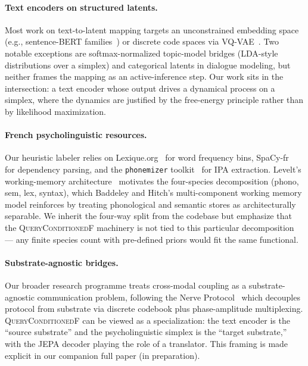 \paragraph{Text encoders on structured latents.}
Most work on text-to-latent mapping targets an unconstrained
embedding space (e.g., sentence-BERT families~\citep{reimers2019sbert})
or discrete code spaces via VQ-VAE~\citep{vandenoord2017neural}.
Two notable exceptions are softmax-normalized topic-model bridges
(LDA-style distributions over a simplex) and categorical latents in
dialogue modeling, but neither frames the mapping as an active-inference
step. Our work sits in the intersection: a text encoder whose output
drives a dynamical process on a simplex, where the dynamics are
justified by the free-energy principle rather than by likelihood
maximization.

\paragraph{French psycholinguistic resources.}
Our heuristic labeler relies on Lexique.org~\citep{newboucard2004lexique}
for word frequency bins, SpaCy-fr~\citep{honnibal2020spacy} for
dependency parsing, and the \texttt{phonemizer}
toolkit~\citep{phonemizer} for IPA extraction.
Levelt's working-memory architecture~\citep{levelt1989speaking}
motivates the four-species decomposition (phono, sem, lex,
syntax), which Baddeley and Hitch's multi-component working memory
model \citep{baddeley1974} reinforces by treating phonological and
semantic stores as architecturally separable. We inherit the
four-way split from the codebase but emphasize that the
\textsc{QueryConditionedF} machinery is not tied to this particular
decomposition --- any finite species count with pre-defined priors
would fit the same functional.

\paragraph{Substrate-agnostic bridges.}
Our broader research programme treats cross-modal coupling as a
substrate-agnostic communication problem, following the Nerve
Protocol~\citep{saillant2026nervewml} which decouples protocol from
substrate via discrete codebook plus phase-amplitude
multiplexing. \textsc{QueryConditionedF} can be viewed as a
specialization: the text encoder is the ``source substrate'' and the
psycholinguistic simplex is the ``target substrate,'' with the JEPA
decoder playing the role of a translator. This framing is made
explicit in our companion full paper (in preparation).
